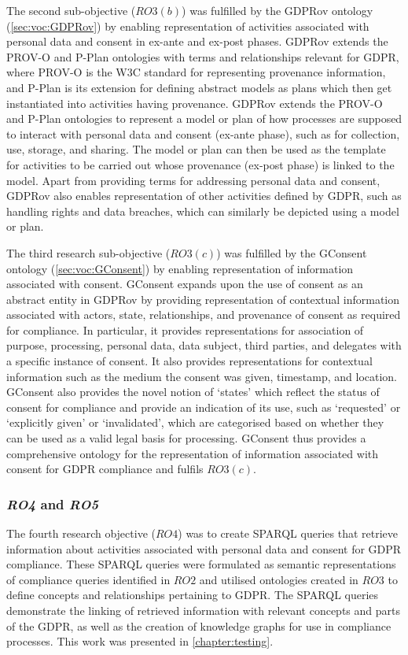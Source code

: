 The second sub-objective ($RO3(b)$) was fulfilled by the GDPRov ontology (\autoref{sec:voc:GDPRov}) by enabling representation of activities associated with personal data and consent in ex-ante and ex-post phases. GDPRov extends the PROV-O \cite{lebo_prov-o_2013} and P-Plan \cite{garijo_p-plan_2014} ontologies with terms and relationships relevant for GDPR, where PROV-O is the W3C standard for representing provenance information, and P-Plan is its extension for defining abstract models as plans which then get instantiated into activities having provenance. GDPRov extends the PROV-O and P-Plan ontologies to represent a model or plan of how processes are supposed to interact with personal data and consent (ex-ante phase), such as for collection, use, storage, and sharing. The model or plan can then be used as the template for activities to be carried out whose provenance (ex-post phase) is linked to the model. Apart from providing terms for addressing personal data and consent, GDPRov also enables representation of other activities defined by GDPR, such as handling rights and data breaches, which can similarly be depicted using a model or plan.

The third research sub-objective ($RO3(c)$) was fulfilled by the GConsent ontology (\autoref{sec:voc:GConsent}) by enabling representation of information associated with consent. GConsent expands upon the use of consent as an abstract entity in GDPRov by providing representation of contextual information associated with actors, state, relationships, and provenance of consent as required for compliance. In particular, it provides representations for association of purpose, processing, personal data, data subject, third parties, and delegates with a specific instance of consent. It also provides representations for contextual information such as the medium the consent was given, timestamp,  and location. GConsent also provides the novel notion of `states' which reflect the status of consent for compliance and provide an indication of its use, such as `requested' or `explicitly given' or `invalidated', which are categorised based on whether they can be used as a valid legal basis for processing. GConsent thus provides a comprehensive ontology for the representation of information associated with consent for GDPR compliance and fulfils $RO3(c)$.

\subsubsection*{\textit{RO4} and \textit{RO5}}
The fourth research objective ($RO4$) was to create SPARQL queries that retrieve information about activities associated with personal data and consent for GDPR compliance. These SPARQL queries were formulated as semantic representations of compliance queries identified in $RO2$ and utilised ontologies created in $RO3$ to define concepts and relationships pertaining to GDPR. The SPARQL queries demonstrate the linking of retrieved information with relevant concepts and parts of the GDPR, as well as the creation of knowledge graphs for use in compliance processes. This work was presented in \autoref{chapter:testing}.

